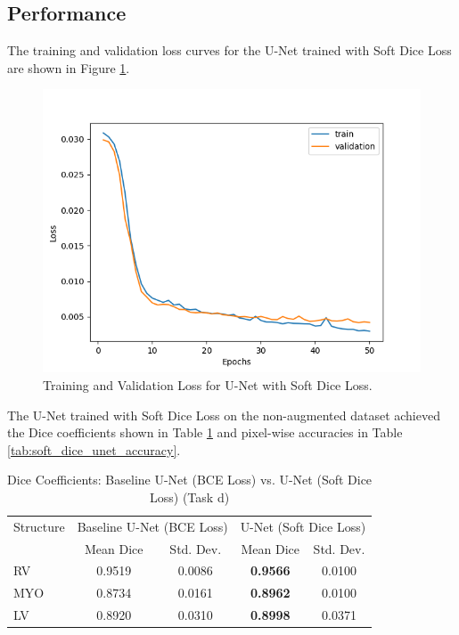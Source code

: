 \documentclass{article}
\begin{document}
\subsection{Performance}
The training and validation loss curves for the U-Net trained with Soft Dice Loss are shown in Figure \ref{fig:soft_dice_loss_curve}.
\begin{figure}[H]
  \centering
  \includegraphics[width=0.8\linewidth]{../result/soft_dice_loss.png}
  \caption{Training and Validation Loss for U-Net with Soft Dice Loss.}
  \label{fig:soft_dice_loss_curve}
\end{figure}

The U-Net trained with Soft Dice Loss on the non-augmented dataset achieved the Dice coefficients shown in Table \ref{tab:soft_dice_unet_comparison} and pixel-wise accuracies in Table \ref{tab:soft_dice_unet_accuracy}.
\begin{table}[H]
  \centering
  \caption{Dice Coefficients: Baseline U-Net (BCE Loss) vs. U-Net (Soft Dice Loss) (Task d)}
  \label{tab:soft_dice_unet_comparison}
  \begin{tabular}{l|cc|cc}
    \toprule
    Structure & \multicolumn{2}{c|}{Baseline U-Net (BCE Loss)} & \multicolumn{2}{c}{U-Net (Soft Dice Loss)}                               \\
              & Mean Dice                                      & Std. Dev.                                  & Mean Dice       & Std. Dev. \\
    \midrule
    RV        & 0.9519                                         & 0.0086                                     & \textbf{0.9566} & 0.0100    \\
    MYO       & 0.8734                                         & 0.0161                                     & \textbf{0.8962} & 0.0100    \\
    LV        & 0.8920                                         & 0.0310                                     & \textbf{0.8998} & 0.0371    \\
    \bottomrule
  \end{tabular}
\end{table}
\end{document}
